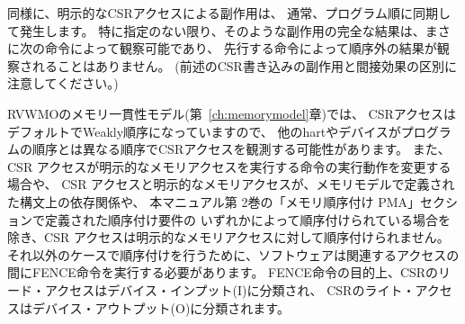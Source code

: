 同様に、明示的なCSRアクセスによる副作用は、
通常、プログラム順に同期して発生します。
特に指定のない限り、そのような副作用の完全な結果は、まさに次の命令によって観察可能であり、
先行する命令によって順序外の結果が観察されることはありません。
(前述のCSR書き込みの副作用と間接効果の区別に注意してください。)


\begin{comment}
For the RVWMO memory consistency model (Chapter~\ref{ch:memorymodel}),
CSR accesses are weakly ordered by default,
so other harts or devices may observe CSR accesses in an order
different from program order. In addition, CSR accesses are not ordered with
respect to explicit memory accesses, unless a CSR access modifies the execution
behavior of the instruction that performs the explicit memory access or unless
a CSR access and an explicit memory access are ordered by either the syntactic
dependencies defined by the memory model or the ordering requirements defined
by the Memory-Ordering PMAs section in Volume II of this manual. To enforce
ordering in all other cases, software should execute a FENCE instruction
between the relevant accesses. For the purposes of the FENCE instruction, CSR
read accesses are classified as device input (I), and CSR write accesses are
classified as device output (O).
\end{comment}

RVWMOのメモリ一貫性モデル(第~\ref{ch:memorymodel}章)では、
CSRアクセスはデフォルトでWeakly順序になっていますので、
他のhartやデバイスがプログラムの順序とは異なる順序でCSRアクセスを観測する可能性があります。
また、CSR アクセスが明示的なメモリアクセスを実行する命令の実行動作を変更する場合や、
CSR アクセスと明示的なメモリアクセスが、メモリモデルで定義された構文上の依存関係や、
本マニュアル第 2巻の「メモリ順序付け PMA」セクションで定義された順序付け要件の
いずれかによって順序付けられている場合を除き、CSR アクセスは明示的なメモリアクセスに対して順序付けられません。
それ以外のケースで順序付けを行うために、ソフトウェアは関連するアクセスの間にFENCE命令を実行する必要があります。
FENCE命令の目的上、CSRのリード・アクセスはデバイス・インプット(I)に分類され、
CSRのライト・アクセスはデバイス・アウトプット(O)に分類されます。


